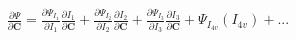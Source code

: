 \documentclass[preview]{standalone}
\begin{document}
\begin{align*}
\frac{\partial \Psi}{\partial \mathbf{C}}  =  \frac{\partial \Psi_{I_1}}{\partial I_1}\frac{\partial I_1}{\partial \mathbf{C}}  +  \frac{\partial \Psi_{I_2}}{\partial I_2}\frac{\partial I_2}{\partial \mathbf{C}}  +  \frac{\partial \Psi_{I_3}}{\partial I_3}\frac{\partial I_3}{\partial \mathbf{C}}  +  \Psi_{I_{4v}}(I_{4v})  + ...
\end{align*}
\end{document}
